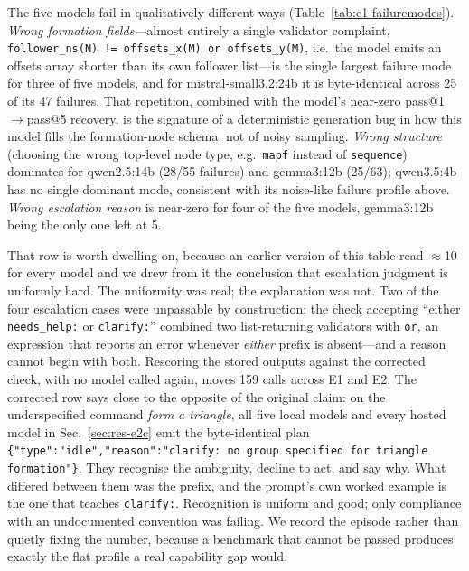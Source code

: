 \documentclass[10pt,twocolumn]{article}
\newcommand{\code}[1]{\texttt{\small #1}}
\begin{document}
The five models fail in qualitatively different ways
(Table~\ref{tab:e1-failuremodes}). \emph{Wrong formation fields}---almost
entirely a single validator complaint, \code{follower\_ns(N) !=
offsets\_x(M) or offsets\_y(M)}, i.e.\ the model emits an offsets array
shorter than its own follower list---is the single largest failure mode for
three of five models, and for mistral-small3.2:24b it is byte-identical
across 25 of its 47 failures. That repetition, combined with the model's
near-zero pass@1$\to$pass@5 recovery, is the signature of a deterministic
generation bug in how this model fills the formation-node schema, not of
noisy sampling. \emph{Wrong structure} (choosing the wrong top-level node
type, e.g.\ \code{mapf} instead of \code{sequence}) dominates for
qwen2.5:14b (28/55 failures) and gemma3:12b (25/63); qwen3.5:4b has no
single dominant mode, consistent with its noise-like failure profile above.
\emph{Wrong escalation reason} is near-zero for four of the five models,
gemma3:12b being the only one left at 5.

That row is worth dwelling on, because an earlier version of this table read
$\approx$10 for every model and we drew from it the conclusion that escalation
judgment is uniformly hard. The uniformity was real; the explanation was not.
Two of the four escalation cases were unpassable by construction: the check
accepting ``either \code{needs\_help:} or \code{clarify:}'' combined two
list-returning validators with \code{or}, an expression that reports an error
whenever \emph{either} prefix is absent---and a reason cannot begin with both.
Rescoring the stored outputs against the corrected check, with no model called
again, moves 159 calls across E1 and E2. The corrected row says close to the
opposite of the original claim: on the underspecified command \emph{form a
triangle}, all five local models and every hosted model in
Sec.~\ref{sec:res-e2c} emit the byte-identical plan
\code{\{"type":"idle","reason":"clarify: no group specified for triangle
formation"\}}. They recognise the ambiguity, decline to act, and say why.
What differed between them was the prefix, and the prompt's own worked example
is the one that teaches \code{clarify:}. Recognition is uniform and good; only
compliance with an undocumented convention was failing. We record the episode
rather than quietly fixing the number, because a benchmark that cannot be
passed produces exactly the flat profile a real capability gap would.
\end{document}
